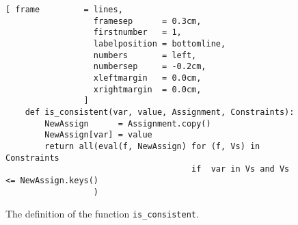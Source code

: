 \begin{figure}[!ht]
\centering
\begin{Verbatim}[ frame         = lines, 
                  framesep      = 0.3cm, 
                  firstnumber   = 1,
                  labelposition = bottomline,
                  numbers       = left,
                  numbersep     = -0.2cm,
                  xleftmargin   = 0.0cm,
                  xrightmargin  = 0.0cm,
                ]
    def is_consistent(var, value, Assignment, Constraints):
        NewAssign      = Assignment.copy()
        NewAssign[var] = value
        return all(eval(f, NewAssign) for (f, Vs) in Constraints
                                      if  var in Vs and Vs <= NewAssign.keys()
                  )
\end{Verbatim}
\vspace*{-0.3cm}
\caption{The definition of the function \texttt{is\_consistent}.}
\label{fig:is_consistent.py}
\end{figure}

